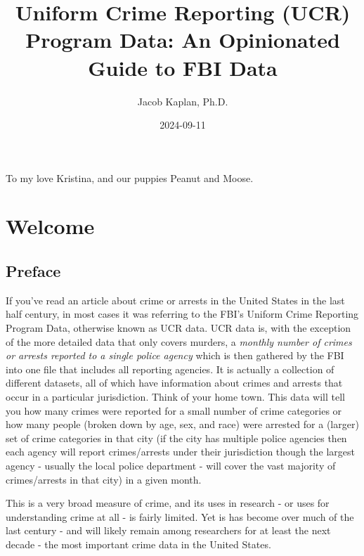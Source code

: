 \documentclass[
]{krantz}
\title{Uniform Crime Reporting (UCR) Program Data: An
Opinionated Guide to FBI Data}
\author{Jacob Kaplan, Ph.D.}
\date{2024-09-11}
\begin{document}
\maketitle

\thispagestyle{empty}
\begin{center}
To my love Kristina, and our puppies Peanut and Moose.
\end{center}

\setlength{\abovedisplayskip}{-5pt}
\setlength{\abovedisplayshortskip}{-5pt}

{
\hypersetup{linkcolor=}
\setcounter{tocdepth}{2}
\tableofcontents
}
\mainmatter

\part{Welcome}\label{part-welcome}

\chapter{Preface}\label{preface}

If you've read an article about crime or arrests in the
United States in the last half century, in most cases it was
referring to the FBI's Uniform Crime Reporting Program Data,
otherwise known as UCR data. UCR data is, with the exception
of the more detailed data that only covers murders, a
\emph{monthly number of crimes or arrests reported to a
single police agency} which is then gathered by the FBI into
one file that includes all reporting agencies. It is
actually a collection of different datasets, all of which
have information about crimes and arrests that occur in a
particular jurisdiction. Think of your home town. This data
will tell you how many crimes were reported for a small
number of crime categories or how many people (broken down
by age, sex, and race) were arrested for a (larger) set of
crime categories in that city (if the city has multiple
police agencies then each agency will report crimes/arrests
under their jurisdiction though the largest agency - usually
the local police department - will cover the vast majority
of crimes/arrests in that city) in a given month.

This is a very broad measure of crime, and its uses in
research - or uses for understanding crime at all - is
fairly limited. Yet is has become over much of the last
century - and will likely remain among researchers for at
least the next decade - the most important crime data in the
United States.
\end{document}

